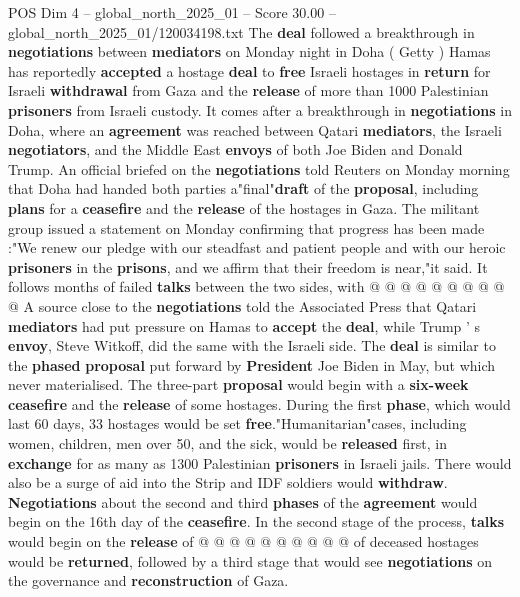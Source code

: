 \begin{textsample}{POS Dim 4 – global\_north\_2025\_01 – Score 30.00 – global\_north\_2025\_01/120034198.txt}  \label{ex:f4_pos_044}
The \textbf{deal} followed a breakthrough in \textbf{negotiations} between \textbf{mediators} on Monday night in Doha ( Getty ) Hamas has reportedly \textbf{accepted} a hostage \textbf{deal} to \textbf{free} Israeli hostages in \textbf{return} for Israeli \textbf{withdrawal} from Gaza and the \textbf{release} of more than 1000 Palestinian \textbf{prisoners} from Israeli custody.
It comes after a breakthrough in \textbf{negotiations} in Doha, where an \textbf{agreement} was reached between Qatari \textbf{mediators}, the Israeli \textbf{negotiators}, and the Middle East \textbf{envoys} of both Joe Biden and Donald Trump.
An official briefed on the \textbf{negotiations} told Reuters on Monday morning that Doha had handed both parties a"final"\textbf{draft} of the \textbf{proposal}, including \textbf{plans} for a \textbf{ceasefire} and the \textbf{release} of the hostages in Gaza.
The militant group issued a statement on Monday confirming that progress has been made :"We renew our pledge with our steadfast and patient people and with our heroic \textbf{prisoners} in the \textbf{prisons}, and we affirm that their freedom is near,"it said.
It follows months of failed \textbf{talks} between the two sides, with @ @ @ @ @ @ @ @ @ @ A source close to the \textbf{negotiations} told the Associated Press that Qatari \textbf{mediators} had put pressure on Hamas to \textbf{accept} the \textbf{deal}, while Trump ' s \textbf{envoy}, Steve Witkoff, did the same with the Israeli side.
The \textbf{deal} is similar to the \textbf{phased} \textbf{proposal} put forward by \textbf{President} Joe Biden in May, but which never materialised.
The three-part \textbf{proposal} would begin with a \textbf{six-week} \textbf{ceasefire} and the \textbf{release} of some hostages.
During the first \textbf{phase}, which would last 60 days, 33 hostages would be set \textbf{free}."Humanitarian"cases, including women, children, men over 50, and the sick, would be \textbf{released} first, in \textbf{exchange} for as many as 1300 Palestinian \textbf{prisoners} in Israeli jails.
There would also be a surge of aid into the Strip and IDF soldiers would \textbf{withdraw}. \textbf{Negotiations} about the second and third \textbf{phases} of the \textbf{agreement} would begin on the 16th day of the \textbf{ceasefire}.
In the second stage of the process, \textbf{talks} would begin on the \textbf{release} of @ @ @ @ @ @ @ @ @ @ of deceased hostages would be \textbf{returned}, followed by a third stage that would see \textbf{negotiations} on the governance and \textbf{reconstruction} of Gaza.

\end{textsample}
